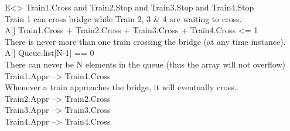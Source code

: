 E<> Train1.Cross and Train2.Stop and Train3.Stop and Train4.Stop \\
Train 1 can cross bridge while Train 2, 3 & 4 are waiting to cross. \\
A[] Train1.Cross + Train2.Cross + Train3.Cross + Train4.Cross <= 1 \\
There is never more than one train crossing the bridge (at any time instance). \\
A[] Queue.list[N-1] == 0 \\
There can never be N elements in the queue (thus the array will not overflow) \\
Train1.Appr --> Train1.Cross \\
Whenever a train approaches the bridge, it will eventually cross. \\
Train2.Appr --> Train2.Cross \\
Train3.Appr --> Train3.Cross \\
Train4.Appr --> Train4.Cross \\




%


